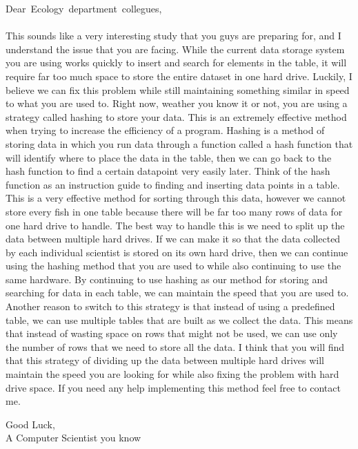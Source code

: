 \documentclass[12pt]{article}
\begin{document}
\newpage
\mbox{Dear Ecology department collegues, }
\\ \\This sounds like a very interesting study that you guys are preparing for, and I understand the issue that you are facing. While the current data storage system you are using works quickly to insert and search for elements in the table, it will require far too much space to store the entire dataset in one hard drive. Luckily, I believe we can fix this problem while still maintaining something similar in speed to what you are used to. Right now, weather you know it or not, you are using a strategy called hashing to store your data. This is an extremely effective method when trying to increase the efficiency of a program. Hashing is a method of storing data in which you run data through a function called a hash function that will identify where to place the data in the table, then we can go back to the hash function to find a certain datapoint very easily later. Think of the hash function as an instruction guide to finding and inserting data points in a table. This is a very effective method for sorting through this data, however we cannot store every fish in one table because there will be far too many rows of data for one hard drive to handle. The best way to handle this is we need to split up the data between multiple hard drives. If we can make it so that the data collected by each individual scientist is stored on its own hard drive, then we can continue using the hashing method that you are used to while also continuing to use the same hardware. By continuing to use hashing as our method for storing and searching for data in each table, we can maintain the speed that you are used to. Another reason to switch to this strategy is that instead of using a predefined table, we can use multiple tables that are built as we collect the data. This means that instead of wasting space on rows that might not be used, we can use only the number of rows that we need to store all the data. I think that you will find that this strategy of dividing up the data between multiple hard drives will maintain the speed you are looking for while also fixing the problem with hard drive space. If you need any help implementing this method feel free to contact me.

Good Luck,
\\A Computer Scientist you know 



\newpage
\pagebreak
\end{document}
